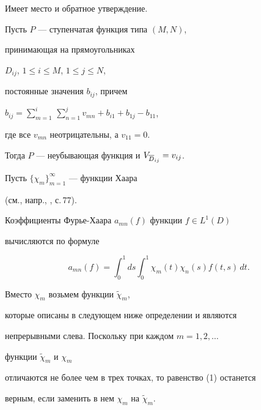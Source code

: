 Имеет место и обратное утверждение.





\begin{lem}


Пусть $P$ --- ступенчатая функция типа $(M,N)$,


принимающая на прямоугольниках


$D_{ij}$, $1 \leqslant i\leqslant M$, $1\leqslant j\leqslant N$,


постоянные значения $b_{ij}$, причем


$b_{ij}= \sum\limits_{m=1}^{i}\, \sum\limits_{n=1}^{j}


v_{mn} +b_{i1}+b_{1j}-b_{11}$,


где все $v_{mn}$ неотрицательны, а $v_{11}=0$.


Тогда $P$ --- неубывающая функция и $V_{\overline D_{ij}}=v_{ij}$.


\end{lem}





Пусть $\{\chi_m\}_{m=1}^\infty$ --- функции Хаара


(см., напр., \cite{5}, с.\,77).


Коэффициенты Фурье-Хаара $a_{mn}(f)$ функции $f\in L^1(D)$


вычисляются по формуле


\begin{equation}


a_{mn}(f)=\int_0^1 ds\int_0^1 \chi_m(t)\chi_n(s)f(t,s)\,dt.


\end{equation}


Вместо $\chi_m$ возьмем функции $\widetilde\chi_m$,


которые описаны в следующем ниже определении и являются


непрерывными слева. Поскольку при каждом $m=1,2,\dotsc$


функции $\widetilde\chi_m$ и $\chi_m$


отличаются не более чем в трех точках, то равенство (1) останется


верным, если заменить в нем $\chi_m$ на $\widetilde\chi_m$.





